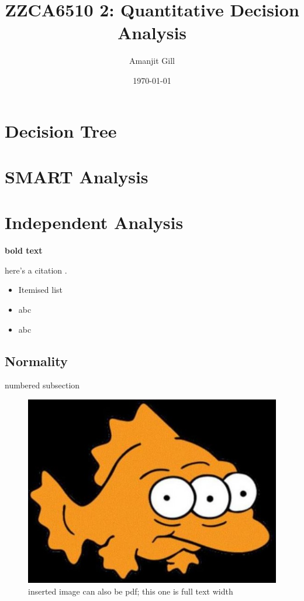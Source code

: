 \documentclass[11pt, a4paper]{article}
\title{\Large\bfseries ZZCA6510 2: Quantitative Decision Analysis}
\author{\large Amanjit Gill}
\date{\small \today}
\begin{document}
    
    \maketitle

    \section{Decision Tree}

    \section{SMART Analysis}

    \section{Independent Analysis}
        
    \textbf{bold text}

    here's a citation \parencite{transformations}.

    \begin{itemize}
        \item Itemised list
        \item abc
        \item abc
    \end{itemize}

    \subsection{Normality}

    numbered subsection

    \begin{figure}[hbt!]
        \centering
        \includegraphics[width=\textwidth]{3uddg6.png}
        \caption{inserted image can also be pdf; this one is full text width}
        \label{imagename}
    \end{figure}
\end{document}
